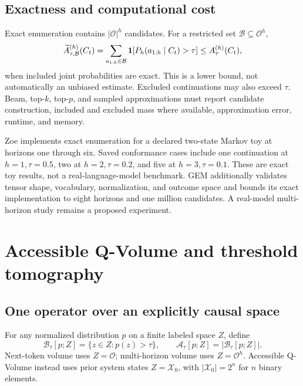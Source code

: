 \subsection{Exactness and computational cost}
Exact enumeration contains $|\mathcal O|^h$ candidates. For a restricted set $\mathcal B\subseteq\mathcal O^h$,
\begin{equation}
\widetilde A^{(h)}_{\tau,\mathcal B}(C_t)=
\sum_{a_{1:h}\in\mathcal B}\mathbf 1[P_h(a_{1:h}\mid C_t)>\tau]
\leq A^{(h)}_\tau(C_t),
\label{eq:restricted-horizon}
\end{equation}
when included joint probabilities are exact. This is a lower bound, not automatically an unbiased estimate. Excluded continuations may also exceed $\tau$. Beam, top-$k$, top-$p$, and sampled approximations must report candidate construction, included and excluded mass where available, approximation error, runtime, and memory.

Zoe implements exact enumeration for a declared two-state Markov toy at horizons one through six. Saved conformance cases include one continuation at $h=1,\tau=0.5$, two at $h=2,\tau=0.2$, and five at $h=3,\tau=0.1$. These are exact toy results, not a real-language-model benchmark. GEM additionally validates tensor shape, vocabulary, normalization, and outcome space and bounds its exact implementation to eight horizons and one million candidates. A real-model multi-horizon study remains a proposed experiment.

\section{Accessible Q-Volume and threshold tomography}
\subsection{One operator over an explicitly causal space}
For any normalized distribution $p$ on a finite labeled space $Z$, define
\begin{equation}
\mathcal B_\tau[p;Z]=\{z\in Z:p(z)>\tau\},\qquad
\mathcal A_\tau[p;Z]=|\mathcal B_\tau[p;Z]|.
\label{eq:generic-accessible}
\end{equation}
Next-token volume uses $Z=\mathcal O$; multi-horizon volume uses $Z=\mathcal O^h$. Accessible Q-Volume instead uses prior system states $Z=\mathcal X_0$, with $|\mathcal X_0|=2^n$ for $n$ binary elements.

